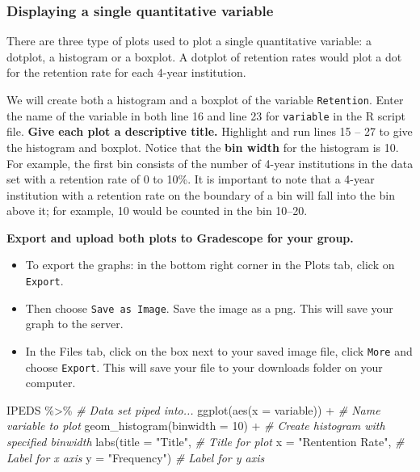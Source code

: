 \documentclass[
]{report}
\newenvironment{Shaded}{\begin{snugshade}}{\end{snugshade}}
\newcommand{\AttributeTok}[1]{\textcolor[rgb]{0.77,0.63,0.00}{#1}}
\newcommand{\CommentTok}[1]{\textcolor[rgb]{0.56,0.35,0.01}{\textit{#1}}}
\newcommand{\DecValTok}[1]{\textcolor[rgb]{0.00,0.00,0.81}{#1}}
\newcommand{\FunctionTok}[1]{\textcolor[rgb]{0.00,0.00,0.00}{#1}}
\newcommand{\NormalTok}[1]{#1}
\newcommand{\SpecialCharTok}[1]{\textcolor[rgb]{0.00,0.00,0.00}{#1}}
\newcommand{\StringTok}[1]{\textcolor[rgb]{0.31,0.60,0.02}{#1}}
\begin{document}
\vspace{0.8in}

\hypertarget{displaying-a-single-quantitative-variable}{%
\subsubsection*{Displaying a single quantitative variable}\label{displaying-a-single-quantitative-variable}}

There are three type of plots used to plot a single quantitative variable: a dotplot, a histogram or a boxplot. A dotplot of retention rates would plot a dot for the retention rate for each 4-year institution.

We will create both a histogram and a boxplot of the variable \texttt{Retention}. Enter the name of the variable in both line 16 and line 23 for \texttt{variable} in the R script file. \textbf{Give each plot a descriptive title.} Highlight and run lines 15 -- 27 to give the histogram and boxplot. Notice that the \textbf{bin width} for the histogram is 10. For example, the first bin consists of the number of 4-year institutions in the data set with a retention rate of 0 to 10\%. It is important to note that a 4-year institution with a retention rate on the boundary of a bin will fall into the bin above it; for example, 10 would be counted in the bin 10--20.

\textbf{Export and upload both plots to Gradescope for your group.}

\begin{itemize}
\item
  To export the graphs: in the bottom right corner in the Plots tab, click on \texttt{Export}.
\item
  Then choose \texttt{Save\ as\ Image}. Save the image as a png. This will save your graph to the server.
\item
  In the Files tab, click on the box next to your saved image file, click \texttt{More} and choose \texttt{Export}. This will save your file to your downloads folder on your computer.
\end{itemize}

\begin{Shaded}
\begin{Highlighting}[]
\NormalTok{IPEDS }\SpecialCharTok{\%\textgreater{}\%} \CommentTok{\# Data set piped into...}
\FunctionTok{ggplot}\NormalTok{(}\FunctionTok{aes}\NormalTok{(}\AttributeTok{x =}\NormalTok{ variable)) }\SpecialCharTok{+}   \CommentTok{\# Name variable to plot}
  \FunctionTok{geom\_histogram}\NormalTok{(}\AttributeTok{binwidth =} \DecValTok{10}\NormalTok{) }\SpecialCharTok{+}  \CommentTok{\# Create histogram with specified binwidth }
  \FunctionTok{labs}\NormalTok{(}\AttributeTok{title =} \StringTok{"Title"}\NormalTok{, }\CommentTok{\# Title for plot}
       \AttributeTok{x =} \StringTok{"Rentention Rate"}\NormalTok{, }\CommentTok{\# Label for x axis}
       \AttributeTok{y =} \StringTok{"Frequency"}\NormalTok{) }\CommentTok{\# Label for y axis}
\end{Highlighting}
\end{Shaded}
\end{document}

